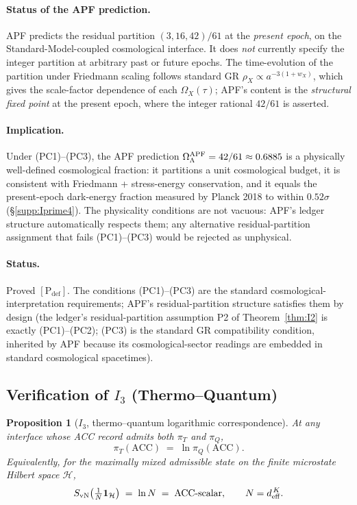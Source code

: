 \documentclass[11pt]{article}
\theoremstyle{plain}
\newtheorem{proposition}[theorem]{Proposition}
\theoremstyle{definition}
\theoremstyle{remark}
\begin{document}
\paragraph{Status of the APF prediction.}  APF predicts the residual partition $(3, 16, 42)/61$ at the \emph{present epoch}, on the Standard-Model-coupled cosmological interface.  It does \emph{not} currently specify the integer partition at arbitrary past or future epochs.  The time-evolution of the partition under Friedmann scaling follows standard GR $\rho_X \propto a^{-3(1+w_X)}$, which gives the scale-factor dependence of each $\Omega_X(\tau)$; APF's content is the \emph{structural fixed point} at the present epoch, where the integer rational $42/61$ is asserted.

\paragraph{Implication.}  Under (PC1)--(PC3), the APF prediction $\Omega_\Lambda^{\rm APF} = 42/61 \approx 0.6885$ is a physically well-defined cosmological fraction: it partitions a unit cosmological budget, it is consistent with Friedmann + stress-energy conservation, and it equals the present-epoch dark-energy fraction measured by Planck 2018 to within $0.52\sigma$ (\S\ref{supp:Iprime4}).  The physicality conditions are not vacuous: APF's ledger structure automatically respects them; any alternative residual-partition assignment that fails (PC1)--(PC3) would be rejected as unphysical.

\paragraph{Status.}  Proved $[\text{P}_{\mathrm{def}}]$.  The conditions (PC1)--(PC3) are the standard cosmological-interpretation requirements; APF's residual-partition structure satisfies them by design (the ledger's residual-partition assumption P2 of Theorem~\ref{thm:I2} is exactly (PC1)--(PC2); (PC3) is the standard GR compatibility condition, inherited by APF because its cosmological-sector readings are embedded in standard cosmological spacetimes).

\bigskip

\subsection{Verification of \texorpdfstring{$I_3$}{I3} (Thermo--Quantum)}\label{supp:D3}

\begin{proposition}[$I_3$, thermo--quantum logarithmic correspondence]\label{prop:I3}
At any interface whose ACC record admits both $\pi_T$ and $\pi_Q$,
\[
  \pi_T(\mathrm{ACC}) \;=\; \ln \pi_Q(\mathrm{ACC}).
\]
Equivalently, for the maximally mixed admissible state on the finite microstate Hilbert space $\mathcal{H}$,
\[
  S_{\rm vN}\!\left( \tfrac{1}{N} \mathbf{1}_{\mathcal{H}} \right)
  \;=\; \ln N \;=\; \mathrm{ACC}\text{-scalar},
  \qquad
  N = d_{\rm eff}^{\,K}.
\]
\end{proposition}
\end{document}
